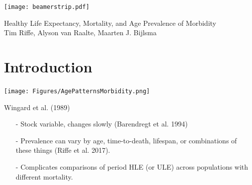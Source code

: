 \documentclass[20pt]{beamer}
\newcommand{\dd}{\; \mathrm{d}}
\begin{document}

\begin{frame}[plain]
	\vspace{-4.4cm}
 \centerline{\texttt{[image: beamerstrip.pdf]}}

	
	\huge
	\vspace{1em}
	
	Healthy Life Expectancy, Mortality, and Age Prevalence of Morbidity \\
	\vspace{1em}
	\large 
	Tim Riffe, Alyson van Raalte, Maarten J. Bijlsma
\end{frame}

\section{Introduction}

\begin{frame}[plain]
\Large
\begin{center}
\only<2>{$\mathrm{HLE} = \int \ell(x)\left(1-\pi(x)\right)\dd x$}
\end{center}
\end{frame}

\begin{frame}[plain]
\begin{center}
\texttt{[image: Figures/AgePatternsMorbidity.png]}
\end{center}
Wingard et al. (1989)
\end{frame}
\begin{frame}[plain]
\Large
\begin{itemize}[<+->]
\item[-] Stock variable, changes slowly (Barendregt et al. 1994)
\item[-] Prevalence can vary by age, time-to-death, lifespan, or combinations of
these things (Riffe et al. 2017).
\item[-] Complicates comparisons of period HLE (or ULE) across
populations with different mortality.
\end{itemize}
\end{frame}
\end{document}
